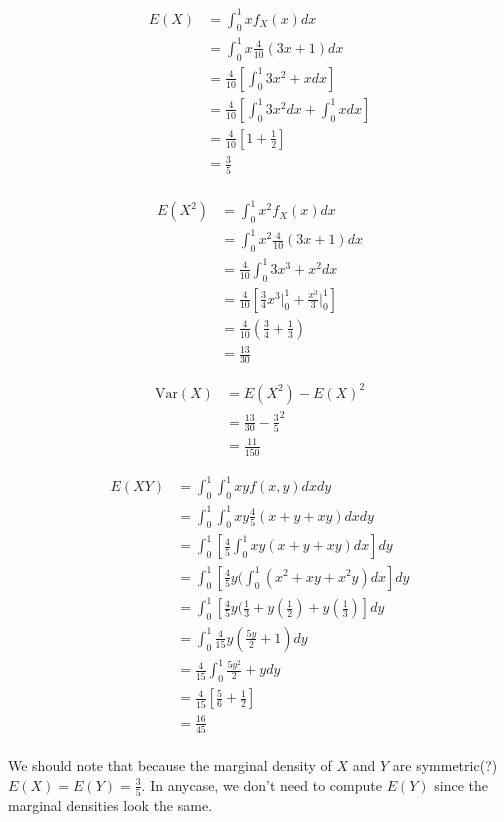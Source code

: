 \documentclass{tufte-book}
\newcommand{\Var}{\mathrm{Var}}
\theoremstyle{mytheoremstyle}
\theoremstyle{mylemstyle}
\theoremstyle{mydefstyle}
\begin{document}
\begin{enumerate}
\begin{align*}
E(X) &= \int_0^1 x f_X(x) dx\\
&= \int_0^1 x \frac{4}{10}(3x+1)dx\\
&= \frac{4}{10}[\int_0^1 3x^2+xdx]\\
&= \frac{4}{10}[\int_0^1 3x^2dx + \int_0^1xdx]\\
&= \frac{4}{10}[1 + \frac{1}{2}]\\
&= \frac{3}{5}\\
\end{align*}

\begin{align*}
E(X^2) &= \int_0^1 x^2 f_X(x)dx\\
&= \int_0^1 x^2 \frac{4}{10}(3x+1)dx\\
&= \frac{4}{10} \int_0^1 3x^3 + x^2 dx\\
&= \frac{4}{10} [\frac{3}{4}x^3\Big|_0^1 + \frac{x^3}{3}\Big|_0^1]\\
&= \frac{4}{10} (\frac{3}{4} + \frac{1}{3})\\
&= \frac{13}{30}
\end{align*}

\begin{align*}
\Var(X) &= E(X^2) - E(X)^2\\
&= \frac{13}{30} - \frac{3}{5}^2\\
&= \frac{11}{150}
\end{align*}

\begin{align*}
E(XY) &= \int_0^1 \int_0^1 xy f(x,y) dxdy\\
&= \int_0^1 \int_0^1 xy \frac{4}{5}(x+y+xy)dxdy\\
&= \int_0^1 [\frac{4}{5}\int_0^1 xy(x + y +xy)dx]dy\\
&= \int_0^1 [\frac{4}{5}y(\int_0^1(x^2 + xy + x^2y)dx]dy\\
&= \int_0^1 [\frac{4}{5}y(\frac{1}{3} + y(\frac{1}{2}) + y(\frac{1}{3})]dy\\
&= \int_0^1 \frac{4}{15}y(\frac{5y}{2}+1)dy\\
&= \frac{4}{15} \int_0^1 \frac{5y^2}{2} + y dy\\
&= \frac{4}{15}[\frac{5}{6} + \frac{1}{2}]\\
&= \frac{16}{45}\\
\end{align*}

We should note that because the marginal density of $X$ and $Y$ are symmetric(?) $E(X)=E(Y)=\frac{3}{5}$.  In anycase, we don't need to compute $E(Y)$ since the marginal densities look the same.


\end{enumerate}
\end{document}
